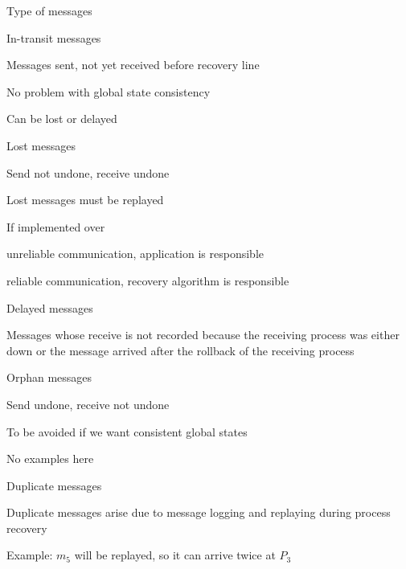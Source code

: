 \begin{frame}{Type of messages}

\begin{overprint}
\begin{block}{\alert{In-transit messages}}
\BI
\item Messages sent, not yet received before recovery line
\item No problem with global state consistency
\item Can be lost or delayed
\EI
\end{block}
\begin{block}{\alert{Lost messages}}
\BI
\item Send not undone, receive undone
\item Lost messages must be replayed
\item If implemented over
	\BI 
	\item unreliable communication, application is responsible
	\item reliable communication, recovery algorithm is responsible
	\EI
\EI
\end{block}
\begin{block}{\alert{Delayed messages}}
\BI
\item Messages whose receive is not recorded because the receiving process was
either down or the message arrived after the rollback of the receiving process
\EI
\end{block}
\begin{block}{\alert{Orphan messages}}
\BI
\item Send undone, receive not undone
\item To be avoided if we want consistent global states
\item No examples here
\EI
\end{block}
\begin{block}{\alert{Duplicate messages}}
\BI
\item Duplicate messages arise due to message logging and replaying during process recovery
\item Example: $m_5$ will be replayed, so it can arrive twice at $P_3$
\EI
\end{block}

\end{overprint}


\end{frame}
